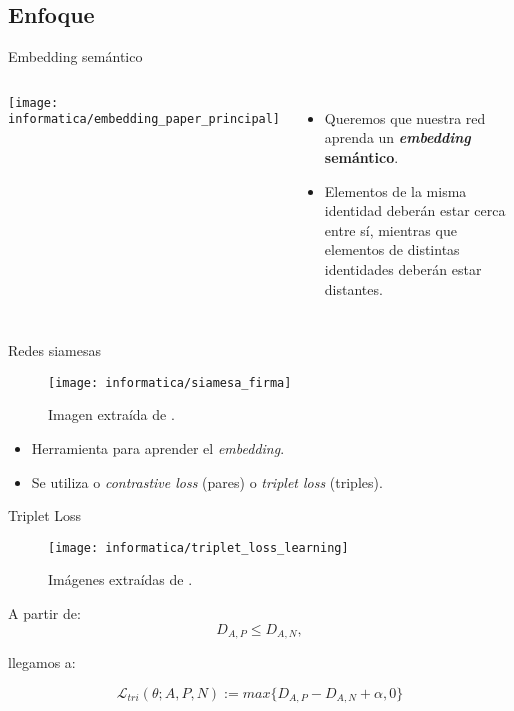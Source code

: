 \subsection{Enfoque}

\begin{frame}{Embedding semántico}
	\begin{columns}
		\centering
		\texttt{[image: informatica/embedding\_paper\_principal]}
		\begin{itemize}
			\item Queremos que nuestra red aprenda un \textbf{\textit{embedding} semántico}.
			\item Elementos de la misma identidad deberán estar cerca entre sí, mientras que elementos de distintas identidades deberán estar distantes.
		\end{itemize}
	\end{columns}
\end{frame}

\begin{frame}{Redes siamesas}

	\begin{figure}
		\texttt{[image: informatica/siamesa\_firma]}
		\caption{Imagen extraída de \cite{informatica:siamesa_web_imagen}.}
		\label{img:siamesa_firma}
	\end{figure}

	\begin{itemize}
		\item Herramienta para aprender el \textit{embedding}.
		\item Se utiliza o \textit{contrastive loss} (pares) o \textit{triplet loss} (triples).
	\end{itemize}

\end{frame}

\begin{frame}{Triplet Loss}
	\begin{figure}
		\texttt{[image: informatica/triplet\_loss\_learning]}
		\caption{Imágenes extraídas de \cite{informatica:cacd_dataset}.}
	\end{figure}

	A partir de:
	\begin{equation}
		D_{A, P} \leq D_{A, N},
	\end{equation}

	llegamos a:

	\begin{equation} \label{ieq:triplet_loss_single_entry}
		\mathcal{L}_{tri}(\theta; A, P, N) := max \{D_{A, P} - D_{A, N} + \alpha, 0 \}
	\end{equation}
\end{frame}

